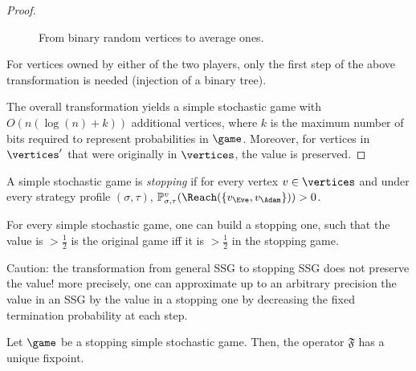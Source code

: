 \begin{proof}
\begin{figure}[htbp]
    \caption{From binary random vertices to average ones.}
    \label{6-fig:simul}
  \end{figure}

  
  For vertices owned by either of the two players, only the first step
  of the above transformation is needed (injection of a binary tree).

  The overall transformation yields a simple stochastic game with
  $O(n(\log(n)+k))$ additional vertices, where $k$ is the maximum
  number of bits required to represent probabilities in
  $\game$. Moreover, for vertices in $\vertices'$ that were originally
  in $\vertices$, the value is preserved.
\end{proof}


\begin{definition}
  A simple stochastic game is \emph{stopping} if for every vertex
  $v \in \vertices$ and under every  strategy profile
  $(\sigma,\tau)$, $\probm_{\sigma,\tau}^v(\Reach(\{v_\Eve,v_\Adam\})) >0$.
\end{definition}


\begin{theorem}
\label{6-thm:reduction_stopping_games}
For every simple stochastic game, one can build a  stopping  one, such that the value is $> \frac{1}{2}$ is the original game iff it is $>\frac{1}{2}$ in the stopping game. 
\end{theorem}

Caution: the transformation from general SSG to stopping
SSG does not preserve the value! more precisely, one can approximate
up to an arbitrary precision the value in an SSG by the value in a
stopping one by decreasing the fixed termination probability at each step.

\begin{proposition}
\label{6-prop:fixed_point_characterisation_stopping_ssg}
Let $\game$ be a stopping simple stochastic game. Then, the operator $\mathfrak{F}$ has a unique fixpoint.
\end{proposition}

